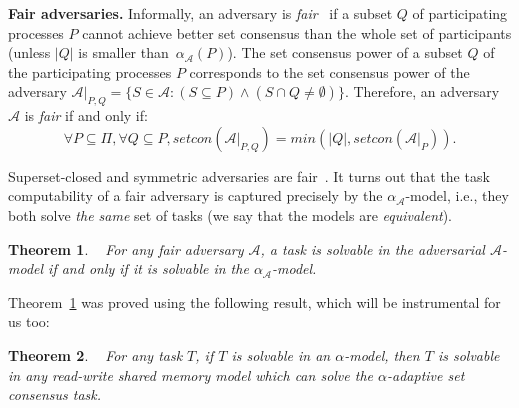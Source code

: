 \documentclass[a4paper]{article}
\newtheorem{theorem}{Theorem}
\newtheorem{definition}{Definition}
\newcommand{\myparagraph}[1]{\vspace{6pt}\noindent \textbf{#1}}
\def\A{\ensuremath{\mathcal{A}}}
\def\fair{\textit{fair}}
\def\Fair{\textit{Fair}}
\newcommand{\setcon}{\mathit{setcon}}
\newcommand{\remove}[1]{}
\begin{document}
\myparagraph{Fair adversaries.}
%
Informally, an adversary is \emph{{\fair}}~\cite{KR17} if a subset $Q$ of
participating processes $P$ cannot achieve better set consensus than the
whole set of participants (unless $|Q|$ is smaller than~$\alpha_{\A}(P)$).
The set consensus power of a subset $Q$ of the participating processes $P$
corresponds to the set consensus power of the adversary 
$\A|_{P,Q} = \{S\in\A:(S\subseteq P)\wedge(S\cap Q\neq\emptyset)\}.$
Therefore, an adversary $\A$ is {\fair} if and only if:
\[\forall P \subseteq \Pi, \forall Q\subseteq P, \setcon(\A|_{P,Q})= min(|Q|,\setcon(\A|_P)){}.\]

Superset-closed and symmetric adversaries are fair~\cite{KR17}.
%
It turns out that the task computability of a fair adversary is
captured precisely by the $\alpha_\A$-model, i.e.,
they both solve \emph{the same} set of tasks
(we say that the models are \emph{equivalent}).

\begin{theorem}~\cite{KR17}
\label{th:adv:task}
For any {\fair} adversary $\A$, a task is solvable in the adversarial
$\A$-model if and only if it is solvable in the $\alpha_\A$-model. %
\end{theorem} 
%

Theorem~\ref{th:adv:task} was proved using the following result, which
will be instrumental for us too:
\begin{theorem}~\cite{KR17}
\label{read/writeAndConsensus}
For any task $T$, if $T$ is solvable in an $\alpha$-model, then $T$ is solvable in \emph{any} read-write shared 
memory model which can solve the $\alpha$-adaptive set consensus task.
\end{theorem}

\remove{
%
\begin{theorem}~\cite{KR17}
  \label{thm:AdaptiveAgreement}
There exists an \emph{$\alpha$-adaptive}  set consensus algorithm
that, in any run with a participating set $P$,
satisfies the following properties: (\emph{Termination}) All \emph{correct} processes
eventually decide;
%
(\emph{Agreement}) At most $\alpha(P)$ different values are decided,
with $P$ the participation at the earliest time a process decided;
%
(\emph{Validity}) Each decided value has been proposed by some process.
\end{theorem}
}
\end{document}
